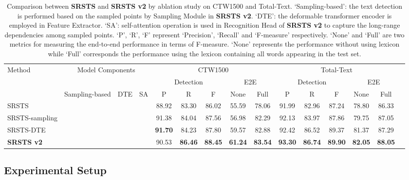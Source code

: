 \begin{table*}[!t]
\renewcommand{\arraystretch}{1.1}
  \caption{Comparison between \textbf{SRSTS} and \textbf{SRSTS v2} by ablation study on CTW1500 and Total-Text. `Sampling-based': the text detection is performed based on the sampled points by Sampling Module in \textbf{SRSTS v2}. `DTE': the deformable transformer encoder is employed in Feature Extractor. `SA': self-attention operation is used in Recognition Head of \textbf{SRSTS v2} to capture the long-range dependencies among sampled points. `P’, `R’, `F’ represent `Precision', `Recall' and `F-measure' respectively. `None' and `Full' are two metrics for measuring the end-to-end performance in terms of F-measure. `None’ represents the performance without using lexicon while ‘Full’ corresponds the performance using the lexicon containing all words appearing in the test set.}
  \label{tab:ablative}
  \centering
\begin{tabular}{l|ccc|ccccc|cccccc}
    \toprule
\multirow{3}{*}{Method} & \multicolumn{3}{c|}{\multirow{2}{*}{Model Components}} &\multicolumn{5}{c|}{CTW1500} & \multicolumn{5}{c}{Total-Text}\\
    \cmidrule(lr){5-9}
    \cmidrule(lr){10-14}
& & & &\multicolumn{3}{c}{Detection} & \multicolumn{2}{c|}{E2E}&\multicolumn{3}{c}{Detection} & \multicolumn{2}{c}{E2E}\\
    \cmidrule(lr){2-4}
    \cmidrule(lr){5-7}
    \cmidrule(lr){8-9}
    \cmidrule(lr){10-12}
    \cmidrule(lr){13-14}
&Sampling-based & DTE & SA& P&R&F& None &Full& P&R&F& None &Full\\
\midrule
SRSTS~\cite{wu2022decoupling} & & &  & 88.92&83.30 &86.02 &55.59 &78.06 &91.99 & 82.96 &87.24&78.80& 86.33  \\
    \midrule
SRSTS-sampling  &  & & & 91.38 & 84.04&87.56& 56.98 & 82.29 & 92.13  &83.97 &87.86&79.75&87.05   \\
    SRSTS-DTE  &     &  & &\textbf{91.70}&84.23&87.80&59.57&82.88 &92.42 &86.52 & 89.37 &81.37 & 87.29 \\
    \midrule 
\textbf{SRSTS v2}  &    &  &   &90.53 & \textbf{86.46}& \textbf{88.45}&\textbf{61.24} & \textbf{83.54 }&\textbf{93.30}& \textbf{86.74}&
\textbf{89.90} &\textbf{82.05}& \textbf{88.05}\\
\bottomrule
  \end{tabular}
\end{table*}
 \subsection{Experimental Setup}


